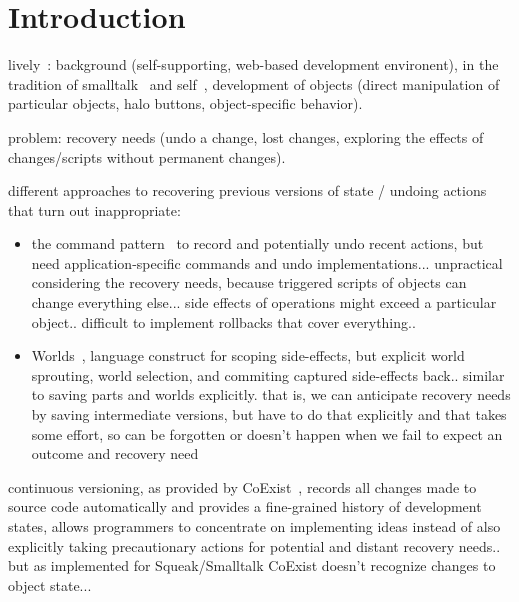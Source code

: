 
\chapter{Introduction} \label{sec:INTRODUCTION}

lively~\cite{Ingalls2008LKS,Krahn2009LWD}: background (self-supporting, web-based development environent), in the tradition of smalltalk~\cite{GoldbergRobson83} and self~\cite{Ungar1987SPS,Ungar2007SEL}, development of objects (direct manipulation of particular objects, halo buttons, object-specific behavior).

problem: recovery needs (undo a change, lost changes, exploring the effects of changes/scripts without permanent changes).


different approaches to recovering previous versions of state / undoing actions that turn out inappropriate:
\begin{itemize}
    \item the command pattern~\cite{GammaHelmJohnsonVlissides95} to record and potentially undo recent actions, but need application-specific commands and undo implementations... unpractical considering the  recovery needs, because triggered scripts of objects can change everything else... side effects of operations might exceed a particular object.. difficult to implement rollbacks that cover everything..
    \item Worlds~\cite{Warth2011Wor}, language construct for scoping side-effects, but explicit world sprouting, world selection, and commiting captured side-effects back.. similar to saving parts and worlds explicitly. that is, we can anticipate recovery needs by saving intermediate versions, but have to do that explicitly and that takes some effort, so can be forgotten or doesn’t happen when we fail to expect an outcome and recovery need
\end{itemize}





continuous versioning, as provided by CoExist~\cite{Steinert2012COE}, records all changes made to source code automatically and provides a fine-grained history of development states, allows programmers to concentrate on implementing ideas instead of also explicitly taking precautionary actions for potential and distant recovery needs..
but as implemented for Squeak/Smalltalk CoExist doesn’t recognize changes to object state...

